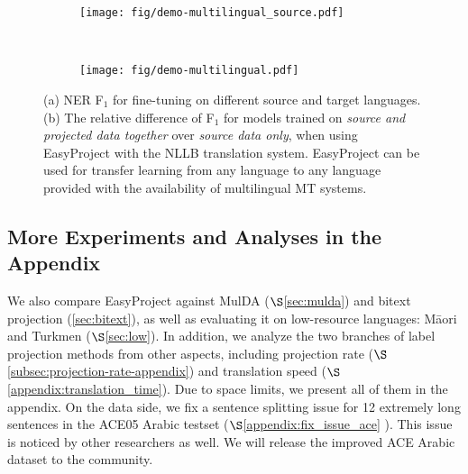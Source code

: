 \documentclass[11pt,dvipsnames]{article}
\begin{document}
\begin{figure*}[pht!]
    \centering
    \vspace{-5pt}
    \begin{subfigure}[t]{0.5\textwidth}
        \centering
                \texttt{[image: fig/demo-multilingual\_source.pdf]}

\end{subfigure}~ 
    \begin{subfigure}[t]{0.5\textwidth}
        \centering
        \texttt{[image: fig/demo-multilingual.pdf]}
\end{subfigure}
    \vspace{-15pt}
    \caption{ (a) NER F$_1$ for fine-tuning on different source and target languages. (b) The relative difference of F$_1$ for models trained on \textit{source and projected data together} over \textit{source data only}, when using EasyProject with the  NLLB translation system. EasyProject  can be used for transfer learning from any language to any language provided with the availability of multilingual MT systems.}
    \vspace{-10pt}
    \label{fig:non_english}
\end{figure*}



\vspace{-1pt}
\subsection{More Experiments and Analyses in the Appendix}
We also compare EasyProject against MulDA \citep{liu-2021-mulda} ($\S$\ref{sec:mulda}) and   bitext projection (\ref{sec:bitext}), as well as  evaluating it on low-resource languages: M\=aori and Turkmen ($\S$\ref{sec:low}). In addition, we analyze  the two branches of label projection methods from other aspects, including  projection rate  ($\S$\ref{subsec:projection-rate-appendix}) and translation speed  ($\S$\ref{appendix:translation_time}).  Due to space limits, we present all of them in the appendix.  On the data side, we  fix a sentence splitting issue for 12 extremely long sentences  in the ACE05 Arabic testset ($\S$\ref{appendix:fix_issue_ace} ). This issue is  noticed by other researchers \cite{huang2022multilingual} as well.
We will release the improved ACE Arabic  dataset to the community.
\end{document}
